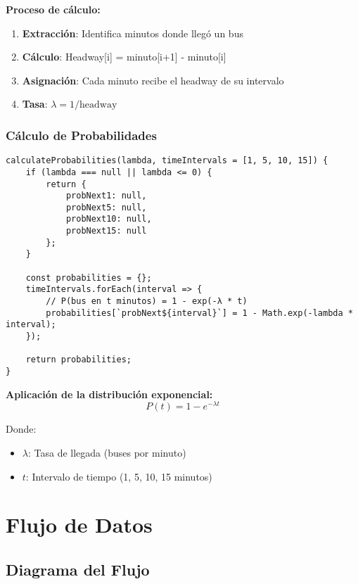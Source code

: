 \documentclass[12pt,a4paper]{article}
\begin{document}
\textbf{Proceso de cálculo:}
\begin{enumerate}
    \item \textbf{Extracción}: Identifica minutos donde llegó un bus
    \item \textbf{Cálculo}: Headway[i] = minuto[i+1] - minuto[i]
    \item \textbf{Asignación}: Cada minuto recibe el headway de su intervalo
    \item \textbf{Tasa}: $\lambda = 1/\text{headway}$
\end{enumerate}

\subsubsection{Cálculo de Probabilidades}

\begin{lstlisting}[caption=Método calculateProbabilities()]
calculateProbabilities(lambda, timeIntervals = [1, 5, 10, 15]) {
    if (lambda === null || lambda <= 0) {
        return {
            probNext1: null,
            probNext5: null,
            probNext10: null,
            probNext15: null
        };
    }

    const probabilities = {};
    timeIntervals.forEach(interval => {
        // P(bus en t minutos) = 1 - exp(-λ * t)
        probabilities[`probNext${interval}`] = 1 - Math.exp(-lambda * interval);
    });

    return probabilities;
}
\end{lstlisting}

\textbf{Aplicación de la distribución exponencial:}
\begin{equation}
P(t) = 1 - e^{-\lambda t}
\end{equation}

Donde:
\begin{itemize}
    \item $\lambda$: Tasa de llegada (buses por minuto)
    \item $t$: Intervalo de tiempo (1, 5, 10, 15 minutos)
\end{itemize}

\section{Flujo de Datos}

\subsection{Diagrama del Flujo}
\end{document}
